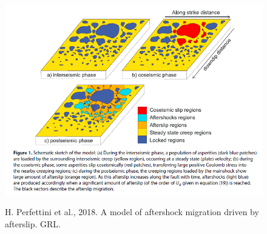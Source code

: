 ﻿\documentclass{beamer}
\begin{document}

\section{}
\begin{frame}
\centerline{}
\centerline{}
\end{frame}

\begin{frame}
\begin{figure}
  \centering
  \includegraphics[scale=0.5]{./pic/position.png}\\
  \caption{H. Perfettini et al., 2018. A model of aftershock migration driven by afterslip. GRL.}\label{fig_okada}
\end{figure}
\end{frame}
\end{document}
